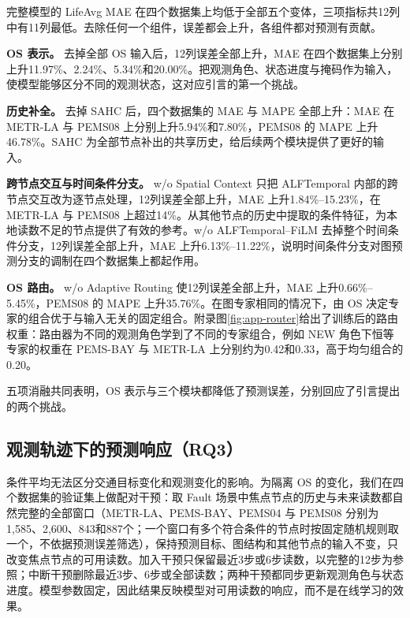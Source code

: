 \begin{table}[t]
\caption{\textbf{五项组件消融（测试集 LifeAvg，种子32）。}每行为一个变体，按所对应的组件分组。每个数据集的每项指标中，最优结果以红色加粗表示，次优结果以蓝色下划线表示，按未舍入值排名。}
\label{tab:ablation}
\centering
\small
\setlength{\tabcolsep}{3pt}
\resizebox{\linewidth}{!}{}
\end{table}

完整模型的 LifeAvg MAE 在四个数据集上均低于全部五个变体，三项指标共12列中有11列最低。去除任何一个组件，误差都会上升，各组件都对预测有贡献。

\textbf{OS 表示。} 去掉全部 OS 输入后，12列误差全部上升，MAE 在四个数据集上分别上升11.97\%、2.24\%、5.34\%和20.00\%。把观测角色、状态进度与掩码作为输入，使模型能够区分不同的观测状态，这对应引言的第一个挑战。

\textbf{历史补全。} 去掉 SAHC 后，四个数据集的 MAE 与 MAPE 全部上升：MAE 在 METR-LA 与 PEMS08 上分别上升5.94\%和7.80\%，PEMS08 的 MAPE 上升46.78\%。SAHC 为全部节点补出的共享历史，给后续两个模块提供了更好的输入。

\textbf{跨节点交互与时间条件分支。} w/o Spatial Context 只把 ALFTemporal 内部的跨节点交互改为逐节点处理，12列误差全部上升，MAE 上升1.84\%–15.23\%，在 METR-LA 与 PEMS08 上超过14\%。从其他节点的历史中提取的条件特征，为本地读数不足的节点提供了有效的参考。w/o ALFTemporal–FiLM 去掉整个时间条件分支，12列误差全部上升，MAE 上升6.13\%–11.22\%，说明时间条件分支对图预测分支的调制在四个数据集上都起作用。

\textbf{OS 路由。} w/o Adaptive Routing 使12列误差全部上升，MAE 上升0.66\%–5.45\%，PEMS08 的 MAPE 上升35.76\%。在图专家相同的情况下，由 OS 决定专家的组合优于与输入无关的固定组合。附录图\ref{fig:app-router}给出了训练后的路由权重：路由器为不同的观测角色学到了不同的专家组合，例如 NEW 角色下恒等专家的权重在 PEMS-BAY 与 METR-LA 上分别约为0.42和0.33，高于均匀组合的0.20。

五项消融共同表明，OS 表示与三个模块都降低了预测误差，分别回应了引言提出的两个挑战。

\subsection{观测轨迹下的预测响应（RQ3）}\label{sec:4_5}

条件平均无法区分交通目标变化和观测变化的影响。为隔离 OS 的变化，我们在四个数据集的验证集上做配对干预：取 Fault 场景中焦点节点的历史与未来读数都自然完整的全部窗口（METR-LA、PEMS-BAY、PEMS04 与 PEMS08 分别为1,585、2,600、843和887个；一个窗口有多个符合条件的节点时按固定随机规则取一个，不依据预测误差筛选），保持预测目标、图结构和其他节点的输入不变，只改变焦点节点的可用读数。加入干预只保留最近3步或6步读数，以完整的12步为参照；中断干预删除最近3步、6步或全部读数；两种干预都同步更新观测角色与状态进度。模型参数固定，因此结果反映模型对可用读数的响应，而不是在线学习的效果。

